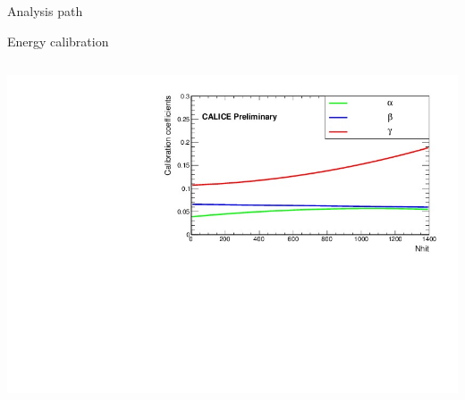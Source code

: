 \documentclass[10pt]{beamer}
\begin{document}
\begin{frame}{Analysis path}
\begin{block}{Energy calibration}
\begin{columns}[t]
\begin{column}{0.5\textwidth}
  \centerline{\includegraphics[height=0.45\textheight]{jpg/evolution.jpg}}

\end{column}
\end{columns}
\end{block}
\end{frame}
\end{document}
